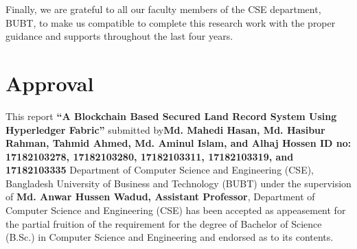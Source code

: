 \documentclass[12pt]{ucthesis}
\begin{document}
\begin{frontmatter}
    Finally, we are grateful to all our faculty members of the CSE department, BUBT, to make us compatible to complete this research work with the proper guidance and supports throughout the last four years.




\chapter*{Approval}
\vspace{-2mm}
This report \textbf{“A Blockchain Based Secured Land Record System Using Hyperledger Fabric”} submitted by\textbf{Md. Mahedi Hasan, Md. Hasibur Rahman, Tahmid Ahmed, Md. Aminul Islam, and Alhaj Hossen ID no: 17182103278, 17182103280, 17182103311, 17182103319, and 17182103335} Department of Computer Science and Engineering (CSE), Bangladesh University of Business and Technology (BUBT) under the supervision of \textbf{ Md. Anwar Hussen Wadud, Assistant Professor}, Department of Computer Science and Engineering (CSE) has been accepted as appeasement for the partial fruition of the requirement for the degree of Bachelor of Science (B.Sc.) in Computer Science and Engineering and endorsed as to its contents.
\enlargethispage{1\baselineskip}
\newline
\begin{tabular}{l}


\end{tabular}
\end{frontmatter}
\end{document}
